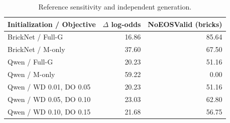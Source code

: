 \begin{table}[htbp]
\centering\small
\caption{Reference sensitivity and independent generation.}
\begin{tabular}{@{}lrr@{}}\toprule
Initialization / Objective & $\Delta$ log-odds & NoEOSValid (bricks) \\
\midrule
BrickNet / Full-G & 16.86 & 85.64 \\
BrickNet / M-only & 37.60 & 67.50 \\
Qwen / Full-G & 20.23 & 51.16 \\
Qwen / M-only & 59.22 & 0.00 \\
Qwen / WD 0.01, DO 0.05 & 20.23 & 51.16 \\
Qwen / WD 0.05, DO 0.10 & 23.03 & 62.80 \\
Qwen / WD 0.10, DO 0.15 & 21.68 & 56.75 \\
\bottomrule\end{tabular}
\end{table}

